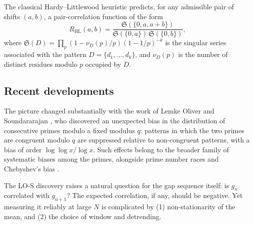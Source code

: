 \documentclass[11pt]{article}
\begin{document}
The classical Hardy--Littlewood heuristic \cite{HL1923} predicts, for
any admissible pair of shifts $(a, b)$, a pair-correlation function of
the form
\begin{equation}
R_{\mathrm{HL}}(a,b) =
\frac{\mathfrak S(\{0,a,a+b\})}
     {\mathfrak S(\{0,a\})\,\mathfrak S(\{0,b\})},
\end{equation}
where $\mathfrak S(D) = \prod_p (1 - \nu_D(p)/p)(1-1/p)^{-k}$ is the
singular series associated with the pattern $D = \{d_1, \dots, d_k\}$,
and $\nu_D(p)$ is the number of distinct residues modulo $p$ occupied
by $D$.

\subsection{Recent developments}
The picture changed substantially with the work of Lemke Oliver and
Soundararajan \cite{LOS2016}, who discovered an unexpected bias in the
distribution of consecutive primes modulo a fixed modulus $q$: patterns
in which the two primes are congruent modulo $q$ are suppressed relative
to non-congruent patterns, with a bias of order $\log\log x / \log x$.
Such effects belong to the broader family of systematic biases among
the primes, alongside prime number races \cite{GranvilleMartin2006} and
Chebyshev's bias \cite{RubinsteinSarnak1994}.

The LO-S discovery raises a natural question for the gap sequence
itself: is $g_n$ correlated with $g_{n+1}$? The expected correlation,
if any, should be negative. Yet measuring it reliably at large $N$ is
complicated by (1) non-stationarity of the mean, and (2) the choice of
window and detrending.
\end{document}
